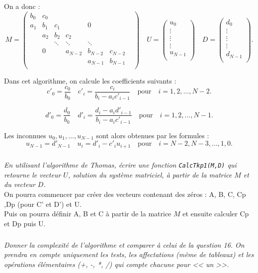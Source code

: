 On a donc : 
$$
M = 
\begin{pmatrix}
b_0 & c_0 &  &  &  &  & \\
a_1 & b_1 & c_1 & &0 & &\\
      & a_2 & b_2 & c_2 & & & \\
& & \ddots & \ddots & \ddots & \\
& 0& & a_{N-2} & b_{N-2} & c_{N-2}\\
& & & & a_{N-1} & b_{N-1}\\
\end{pmatrix}
\quad 
U = \begin{pmatrix}
u_0 \\
\vdots \\
\vdots \\
\vdots  \\
u_{N-1} \\
\end{pmatrix}
\quad 
D = \begin{pmatrix}
d_0 \\
\vdots \\
\vdots \\
\vdots  \\
d_{N-1} \\
\end{pmatrix}.
$$

Dans cet algorithme, on calcule les coefficients suivants : 
$$
c'_0 = \dfrac{c_0}{b_0} \quad c'_i = \dfrac{c_i}{b_i - a_i c'_{i-1}}  \quad \text{pour} \quad i=1,2,\ldots, N-2.$$

$$
d'_0 = \dfrac{d_0}{b_0} \quad d'_i = \dfrac{d_i-a_i d'_{i-1}}{b_i - a_i c'_{i-1}}  \quad \text{pour} \quad i=1,2,\ldots, 
N-1.
$$

Les inconnues $u_0, u_1, \ldots, u_{N-1}$ sont alors obtenues par les formules :
$$
u_{N-1} = d'_{N-1} \quad u_i = d'_i -c'_i u_{i+1} \quad  \text{pour} \quad i=N-2, N-3, \ldots, 1, 0.
$$


\subparagraph{}
\textit{En utilisant l'algorithme de Thomas, écrire une fonction \texttt{CalcTkp1(M,D)} 
qui retourne le vecteur $U$, solution du système matriciel, à partir de la matrice 
$M$ et du vecteur $D$.}\\

On pourra commencer par créer  des vecteurs contenant des zéros :
 A, B, C, Cp ,Dp (pour C' et D') et U.\\
 Puis on pourra  définir A, B et C à partir de la matrice $M$ et ensuite calculer Cp et Dp puis U.


\subparagraph{}
\textit{Donner la complexité de l'algorithme et comparer à celui de la question 16. 
On prendra en compte uniquement les tests, les affectations (même de tableaux)
 et les opérations élémentaires (+, -, *, /) qui compte chacune pour << un >>.}\\
\fi

